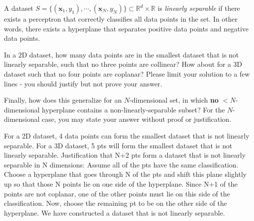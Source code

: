 \begin{problem}[4]
  A dataset $S = \{(\mathbf{x}_1, y_1),\cdots,(\mathbf{x}_N, y_N)\} \subset \mathbb{R}^d \times \mathbb{R}$ is \emph{linearly separable} if there exists a perceptron that correctly classifies all data points in the set. In other words, there exists a hyperplane that separates positive data points and negative data points.

  In a 2D dataset, how many data points are in the smallest dataset that is not linearly separable, such that no three points are collinear? How about for a 3D dataset such that no four points are coplanar? Please limit your solution to a few lines - you should justify but not prove your answer.

  Finally, how does this generalize for an $N$-dimensional set, in which \textbf{no} $<$$N$-dimensional hyperplane contains a non-linearly-separable subset? For the $N$-dimensional case, you may state your answer without proof or justification.
\end{problem}
\begin{solution}
  For a 2D dataset, 4 data points can form the smallest dataset that is not linearly separable. For a 3D dataset, 5 pts will form the smallest dataset that is not linearly separable. Justification that N+2 pts form a dataset that is not linearly separable in N dimensions: \newline \newline
  Assume all of the pts have the same classification. Choose a hyperplane that goes through N of the pts and shift this plane slightly up so that those N points lie on one side of the hyperplane. Since N+1 of the points are not coplanar, one of the other points must lie on this side of the classification. Now, choose the remaining pt to be on the other side of the hyperplane. We have constructed a dataset that is not linearly separable.
\end{solution}

